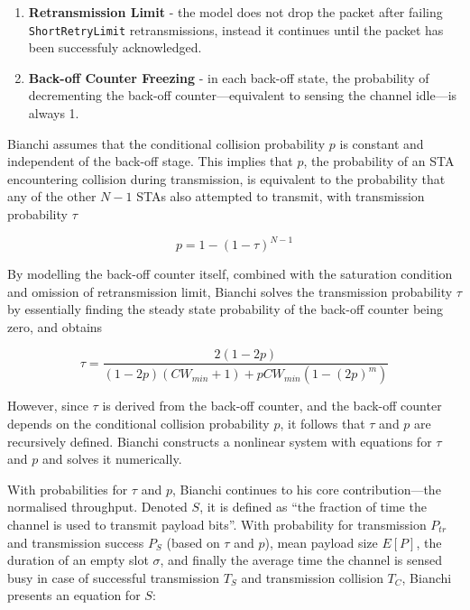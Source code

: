 \begin{enumerate}

	\item \textbf{Retransmission Limit} - the model does not drop the packet
after failing \texttt{ShortRetryLimit} retransmissions, instead it continues
until the packet has been successfuly acknowledged.

	\item \textbf{Back-off Counter Freezing} - in each back-off state, the
probability of decrementing the back-off counter—equivalent to sensing the
channel idle—is always 1.

\end{enumerate}

Bianchi assumes that the conditional collision probability $p$ is constant and
independent of the back-off stage. This implies that $p$, the probability of
an STA encountering collision during transmission, is equivalent to the
probability that any of the other $N-1$ STAs also attempted to transmit, with
transmission probability $\tau$

\begin{equation} \label{eq:pbi}
	p = 1 - (1 - \tau)^{N-1}
\end{equation}

By modelling the back-off counter itself, combined with the saturation
condition and omission of retransmission limit, Bianchi solves the
transmission probability $\tau$ by essentially finding the steady state
probability of the back-off counter being zero, and obtains

\begin{equation} \label{eq:xbi}
	\tau = \frac{2(1-2p)}{(1-2p)(\mathit{CW_{min}}+1)+p\mathit{CW_{min}}(1-(2p)^m)}
\end{equation}

However, since $\tau$ is derived from the back-off counter, and the back-off
counter depends on the conditional collision probability $p$, it follows that
$\tau$ and $p$ are recursively defined. Bianchi constructs a nonlinear system
with equations for $\tau$ and $p$ and solves it numerically.

With probabilities for $\tau$ and $p$, Bianchi continues to his core
contribution—the normalised throughput. Denoted $S$, it is defined as ``the
fraction of time the channel is used to transmit payload bits''. With
probability for transmission $P_{tr}$ and transmission success $P_S$ (based on
$\tau$ and $p$), mean payload size $E[P]$, the duration of an empty slot
$\sigma$, and finally the average time the channel is sensed busy in case of
successful transmission $T_{S}$ and transmission collision $T_{C}$, Bianchi
presents an equation for $S$:

